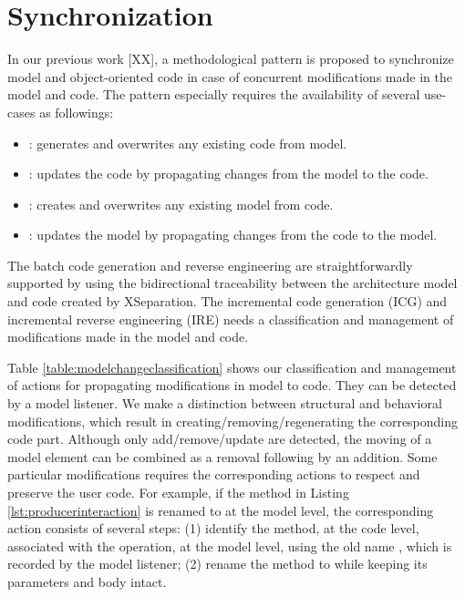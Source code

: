 \section{Synchronization}
\label{sec:collaboration}


In our previous work [XX], a methodological pattern is proposed to synchronize model and object-oriented code in case of concurrent modifications made in the model and code.
The pattern especially requires the availability of several use-cases as followings:
\begin{itemize}
	\item {}: generates and overwrites any existing code from model.
	\item {}: updates the code by propagating changes from the model to the code.
	\item {}: creates and overwrites any existing model from code.
	\item {}: updates the model by propagating changes from the code to the model.
\end{itemize}


The batch code generation and reverse engineering are straightforwardly supported by using the bidirectional traceability between the architecture model and code created by XSeparation. The incremental code generation (ICG) and incremental reverse engineering (IRE) needs a classification and management of modifications made in the model and code.

\vskip 0.2cm
\noindent
{}
Table \ref{table:modelchangeclassification} shows our classification and management of actions for propagating modifications in model to code.
They can be detected by a model listener.
We make a distinction between structural and behavioral modifications, which result in creating/removing/regenerating the corresponding code part.
Although only add/remove/update are detected, the moving of a model element can be combined as a removal following by an addition.  
Some particular modifications requires the corresponding actions to respect and preserve the user code.
For example, if the  method in Listing \ref{lst:producerinteraction} is renamed to  at the model level, the corresponding action consists of several steps: (1) identify the method, at the code level, associated with the operation, at the model level, using the old name , which is recorded by the model listener;
(2) rename the method to  while keeping its parameters and body intact. 

